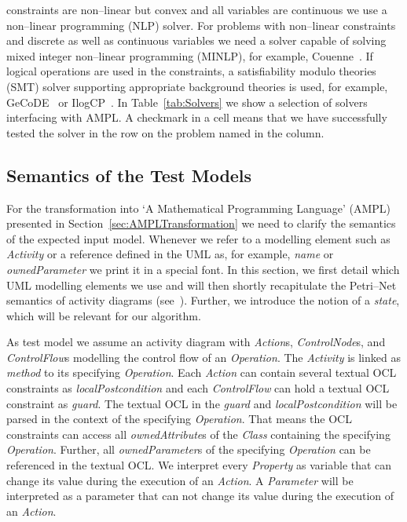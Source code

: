 \documentclass[runningheads,a4paper]{llncs}%
\newcommand{\UMLType}[1]{\textsf{\textit{#1}}} %
\newcommand{\UMLReference}[1]{\textsf{\textit{#1}}} %
\begin{document}
constraints are non--linear but convex and all variables are continuous we use a
non--linear programming (NLP) solver. For problems with non--linear constraints
and discrete as well as continuous variables we need a solver capable of solving
mixed integer non--linear programming (MINLP), for example,
Couenne~\cite{Belotti09couenne}. If logical operations are used in the
constraints, a satisfiability modulo theories (SMT) solver supporting
appropriate background theories is used, for example, GeCoDE~\cite{gecode} or
IlogCP~\cite{ilogcp}. In Table~\ref{tab:Solvers} we show a selection of solvers
interfacing with AMPL. A checkmark in a cell means that we have successfully
tested the solver in the row on the problem named in the column.%
\subsection{Semantics of the Test Models}%
\label{sec:TestModel}%
For the transformation into `A Mathematical Programming Language' (AMPL)
presented in Section~\ref{sec:AMPLTransformation} we need to clarify the
semantics of the expected input model. Whenever we refer to a modelling element
such as \UMLType{Activity} or a reference defined in the UML as, for example,
\UMLReference{name} or \UMLReference{ownedParameter} we print it in a special
font. In this section, we first detail which UML modelling elements we
use and will then shortly recapitulate the Petri--Net semantics of activity
diagrams (see~\cite{UML23Superstructure}). Further, we introduce the notion of a
\emph{state}, which will be relevant for our algorithm.

As test model we assume an activity diagram with \UMLType{Action}s,
\UMLType{ControlNode}s, and \UMLType{ControlFlow}s modelling the control flow of
an \UMLType{Operation}. The \UMLType{Activity} is linked as
\UMLReference{method} to its specifying \UMLType{Operation}. Each
\UMLType{Action} can contain several textual OCL constraints as
\UMLReference{localPostcondition} and each \UMLType{ControlFlow} can hold a
textual OCL constraint as \UMLReference{guard}. The textual OCL in the
\UMLReference{guard} and \UMLReference{localPostcondition} will be parsed in the
context of the specifying \UMLType{Operation}. That means the OCL constraints
can access all \UMLReference{ownedAttribute}s of the \UMLType{Class} containing
the specifying \UMLType{Operation}. Further, all \UMLReference{ownedParameter}s
of the specifying \UMLType{Operation} can be referenced in the textual OCL. We
interpret every \UMLType{Property} as variable that can change its value during
the execution of an \UMLType{Action}. A \UMLType{Parameter} will be interpreted
as a parameter that can not change its value during the execution of an
\UMLType{Action}.
\end{document}
